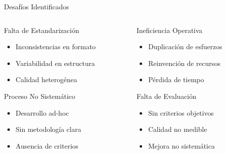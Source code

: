 \documentclass[10pt,aspectratio=169]{beamer}
\begin{document}
	\begin{frame}{Desafíos Identificados}
		\begin{columns}
			\begin{column}{0.45\textwidth}
				\begin{block}{Falta de Estandarización}
					\begin{itemize}
						\item Inconsistencias en formato
						\item Variabilidad en estructura
						\item Calidad heterogénea
					\end{itemize}
				\end{block}
				
				\begin{block}{Proceso No Sistemático}
					\begin{itemize}
						\item Desarrollo ad-hoc
						\item Sin metodología clara
						\item Ausencia de criterios
					\end{itemize}
				\end{block}
			\end{column}
			
			\begin{column}{0.45\textwidth}
				\begin{block}{Ineficiencia Operativa}
					\begin{itemize}
						\item Duplicación de esfuerzos
						\item Reinvención de recursos
						\item Pérdida de tiempo
					\end{itemize}
				\end{block}
				
				\begin{block}{Falta de Evaluación}
					\begin{itemize}
						\item Sin criterios objetivos
						\item Calidad no medible
						\item Mejora no sistemática
					\end{itemize}
				\end{block}
			\end{column}
		\end{columns}
	\end{frame}
\end{document}
